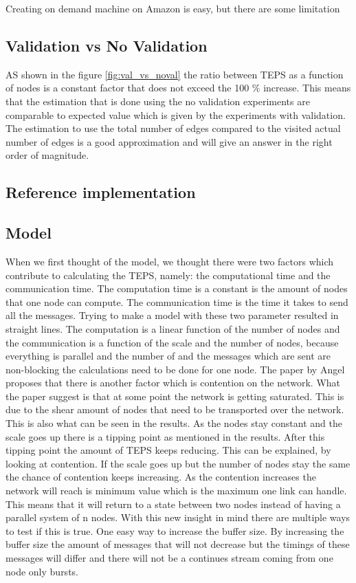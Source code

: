 Creating on demand machine on Amazon is easy, but there are some limitation

\subsection{Validation vs No Validation}
AS shown in the figure \ref{fig:val_vs_noval} the ratio between TEPS as a function of nodes is a constant factor that does not exceed the 100 \% increase. This means that the estimation that is done using the no validation experiments are comparable to expected value which is given by the experiments with validation. The estimation to use the total number of edges compared to the visited actual number of edges is a good approximation and will give an answer in the right order of magnitude. 

\subsection{Reference implementation}


\subsection{Model}
When we first thought of the model, we thought there were two factors which contribute to calculating the TEPS, namely: the computational time and the communication time. The computation time is a constant is the amount of nodes that one node can compute. The communication time is the time it takes to send all the messages. Trying to make a model with these two parameter resulted in straight lines. The computation is a linear function of the number of nodes and the communication is a function of the scale and the number of nodes, because everything is parallel and the number of and the messages which are sent are non-blocking the calculations need to be done for one node. 
The paper by Angel proposes that there is another factor which is contention on the network. What the paper suggest is that at some point the network is getting saturated. This is due to the shear amount of nodes that need to be transported over the network. This is also what can be seen in the results. As the nodes stay constant and the scale goes up there is a tipping point as mentioned in the results. After this tipping point the amount of TEPS keeps reducing. This can be explained, by looking at contention. If the scale goes up but the number of nodes stay the same the chance of contention keeps increasing. As the contention increases the network will reach is minimum value which is the maximum one link can handle. This means that it will return to a state between two nodes instead of having a parallel system of n nodes.
With this new insight in mind there are multiple ways to test if this is true. One easy way to increase the buffer size. By increasing the buffer size the amount of messages that will not decrease but the timings of these messages will differ and there will not be a continues stream coming from one node only bursts.



 